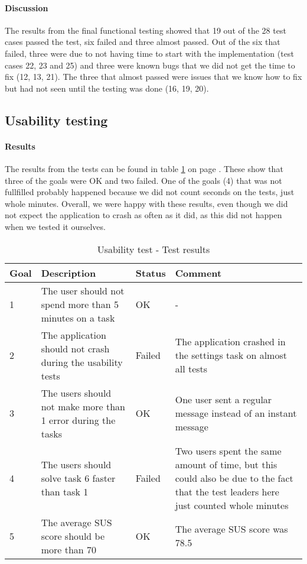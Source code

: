 \paragraph{Discussion}\hfill
\newline
The results from the final functional testing showed that 19 out of the 28 test cases passed the test,  six failed and three almost passed. Out of the six that failed, three were due to not having time to start with the implementation (test cases 22, 23 and 25) and three were known bugs that we did not get the time to fix (12, 13, 21). The three that almost passed were issues that we know how to fix but had not seen until the testing was done (16, 19, 20).

\newpage

\subsection{Usability testing}
\paragraph{Results}\hfill
\newline
The results from the tests can be found in table \ref{tab:usabilitytestresults} on page \pageref{tab:usabilitytestresults}. These show that three of the goals were OK and two failed. One of the goals (4) that was not fullfilled probably happened because we did not count seconds on the tests, just whole minutes. Overall, we were happy with these results, even though we did not expect the application to crash as often as it did, as this did not happen when we tested it ourselves.

\begin{table}[h!]
\begin{center}
\begin{tabular}{l|p{6cm}|l|p{6cm}}	\hline
\textbf{Goal}&\textbf{Description}&\textbf{Status}&\textbf{Comment}\\ \hline \hline
1&The user should not spend more than 5 minutes on a task&OK&-\\ \hline
2&The application should not crash during the usability tests&Failed&The application crashed in the settings task on almost all tests\\ \hline
3&The users should not make more than 1 error during the tasks&OK&One user sent a regular message instead of an instant message\\ \hline
4&The users should solve task 6 faster than task 1&Failed&Two users spent the same amount of time, but this could also be due to the fact that the test leaders here just counted whole minutes\\ \hline
5&The average SUS score should be more than 70&OK&The average SUS score was 78.5\\ \hline 
\end{tabular}
\end{center}
\caption{Usability test - Test results} \label{tab:usabilitytestresults}
\end{table}

